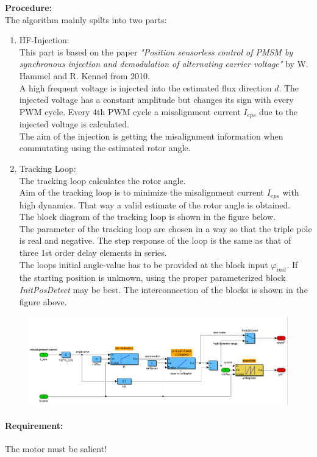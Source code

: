 \textbf{Procedure:}\\
The algorithm mainly spilts into two parts:
\begin{enumerate}
\item HF-Injection:\\
			This part is based on the paper \textit{"Position sensorless control of PMSM by synchronous injection and demodulation of alternating carrier voltage"} by W. Hammel and R. Kennel from 2010.\\
			A high frequent voltage is injected into the estimated flux direction $d$. The injected voltage has a constant amplitude but changes its sign with every PWM cycle. Every 4th PWM cycle a misalignment current $I_{eps}$ due to the injected voltage is calculated.\\
			The aim of the injection is getting the misalignment information when commutating using the estimated rotor angle.
\item Tracking Loop:\\
			The tracking loop calculates the rotor angle.\\
			Aim of the tracking loop is to minimize the misalignment current $I_{eps}$ with high dynamics. That way a valid estimate of the rotor angle is obtained.\\
			The block diagram of the tracking loop is shown in the figure below.\\
			The parameter of the tracking loop are chosen in a way so that the triple pole is real and negative. The step response of the loop is the same as that of three 1st order delay elements in series.\\
			The loops initial angle-value has to be provided at the block input $\varphi_{init}$. If the starting position is unknown, using the proper parameterized block {\itshape InitPosDetect} may be best. The interconnection of the blocks is shown in the figure above.
\end{enumerate}
\begin{figure}[H]
	\includegraphics[width=\textwidth]{TrackingLoop}
\end{figure}

\paragraph{Requirement:} The motor must be salient!